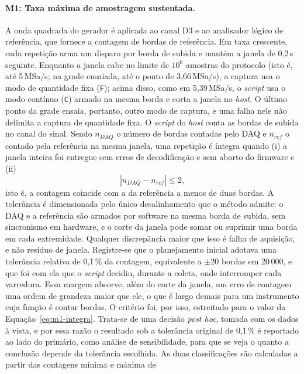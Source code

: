 \paragraph{M1: Taxa máxima de amostragem sustentada.} A onda quadrada do gerador é aplicada ao canal D3 e ao
analisador lógico de referência, que fornece a contagem de bordas de
referência. Em taxa crescente, cada repetição arma um disparo por borda de
subida e mantém a janela de 0,2\,s seguinte. Enquanto a janela cabe no limite
de $10^6$ amostras do protocolo (isto é, até 5\,MSa/s; na grade ensaiada,
até o ponto de 3,66\,MSa/s), a captura usa o modo de
quantidade fixa (\texttt{F}); acima disso, como em 5,39\,MSa/s, o \emph{script}
usa o modo contínuo (\texttt{C}) armado na mesma borda e corta a janela no
\emph{host}. O último ponto da grade ensaia, portanto, outro modo de captura,
e uma falha nele não delimita a captura de quantidade fixa. O \emph{script} do \emph{host} conta as bordas de subida no canal do
sinal. Sendo $n_{DAQ}$ o número de bordas contadas pelo \ac{DAQ} e $n_{ref}$
o contado pela referência na mesma janela, uma repetição é íntegra quando
(i) a janela inteira foi entregue sem erros de decodificação e sem aborto do
firmware e (ii)
\begin{equation}\label{eq:m1-integra}
  \left| n_{DAQ} - n_{ref} \right| \le 2 ,
\end{equation}
isto é, a contagem coincide com a da referência a menos de duas bordas. A
tolerância é dimensionada pelo único desalinhamento que o método admite: o
\ac{DAQ} e a referência são armados por software na mesma borda de subida, sem
sincronismo em hardware, e o corte da janela pode somar ou suprimir uma borda
em cada extremidade. Qualquer discrepância maior que isso é falha de
aquisição, e não resíduo de janela. Registre-se que o planejamento inicial
adotava uma tolerância relativa de 0,1\,\% da contagem, equivalente a
$\pm 20$ bordas em 20\,000, e que foi com ela que o \emph{script} decidiu,
durante a coleta, onde interromper cada varredura. Essa margem absorve, além
do corte da janela, um erro de contagem uma ordem de grandeza maior que ele,
o que é largo demais para um instrumento cuja função é contar bordas. O
critério foi, por isso, estreitado para o valor da
Equação~\ref{eq:m1-integra}. Trata-se de uma decisão \emph{post hoc}, tomada
com os dados à vista, e por essa razão o resultado sob a tolerância original
de 0,1\,\% é reportado ao lado do primário, como análise de sensibilidade,
para que se veja o quanto a conclusão depende da tolerância escolhida. As
duas classificações são calculadas a partir das contagens mínima e máxima de
